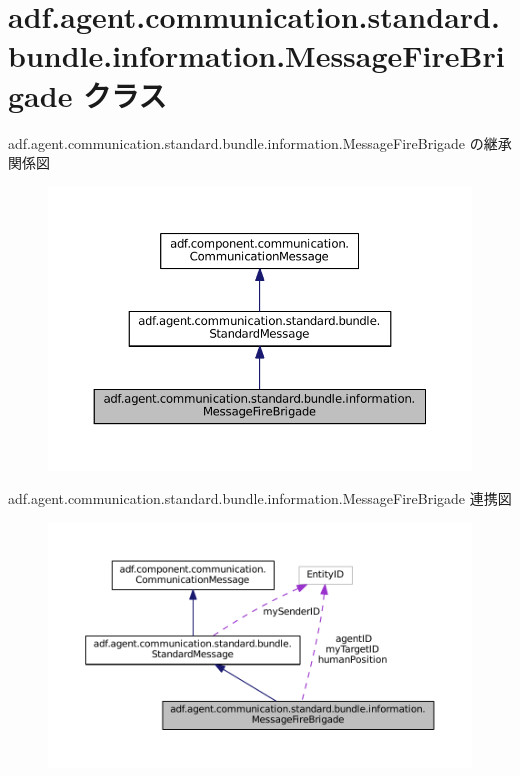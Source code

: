 \hypertarget{classadf_1_1agent_1_1communication_1_1standard_1_1bundle_1_1information_1_1MessageFireBrigade}{}\section{adf.\+agent.\+communication.\+standard.\+bundle.\+information.\+Message\+Fire\+Brigade クラス}
\label{classadf_1_1agent_1_1communication_1_1standard_1_1bundle_1_1information_1_1MessageFireBrigade}


adf.\+agent.\+communication.\+standard.\+bundle.\+information.\+Message\+Fire\+Brigade の継承関係図
\nopagebreak
\begin{figure}[H]
\begin{center}
\leavevmode
\includegraphics[width=350pt]{classadf_1_1agent_1_1communication_1_1standard_1_1bundle_1_1information_1_1MessageFireBrigade__inherit__graph}
\end{center}
\end{figure}


adf.\+agent.\+communication.\+standard.\+bundle.\+information.\+Message\+Fire\+Brigade 連携図
\nopagebreak
\begin{figure}[H]
\begin{center}
\leavevmode
\includegraphics[width=350pt]{classadf_1_1agent_1_1communication_1_1standard_1_1bundle_1_1information_1_1MessageFireBrigade__coll__graph}
\end{center}
\end{figure}
